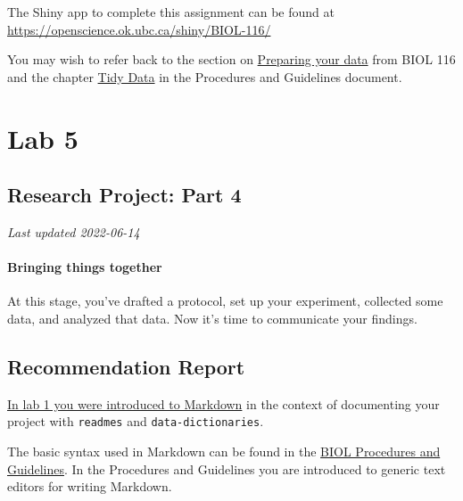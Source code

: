 \documentclass[
]{book}
\begin{document}
The Shiny app to complete this assignment can be found at \url{https://openscience.ok.ubc.ca/shiny/BIOL-116/}

You may wish to refer back to the section on \href{https://ubco-biology.github.io/BIOL-116-Lab-Manual/preparing-your-data.html}{Preparing your data} from BIOL 116 and the chapter \href{https://ubco-biology.github.io/Procedures-and-Guidelines/tidy-data.html}{Tidy Data} in the Procedures and Guidelines document.

\hypertarget{part-lab-5}{%
\part*{Lab 5}\label{part-lab-5}}

\hypertarget{research-project-part-4}{%
\chapter*{Research Project: Part 4}\label{research-project-part-4}}

\emph{Last updated 2022-06-14}

\hypertarget{bringing-things-together}{%
\subsection*{Bringing things together}\label{bringing-things-together}}

At this stage, you've drafted a protocol, set up your experiment, collected some data, and analyzed that data. Now it's time to communicate your findings.

\hypertarget{recommendation-report}{%
\chapter*{Recommendation Report}\label{recommendation-report}}

\href{https://ubco-biology.github.io/Procedures-and-Guidelines/readme-files-and-data-dictionaries.html\#markdown}{In lab 1 you were introduced to Markdown} in the context of documenting your project with \texttt{readmes} and \texttt{data-dictionaries}.

The basic syntax used in Markdown can be found in the \href{https://ubco-biology.github.io/Procedures-and-Guidelines/markdown-1.html}{BIOL Procedures and Guidelines}. In the Procedures and Guidelines you are introduced to generic text editors for writing Markdown.
\end{document}
